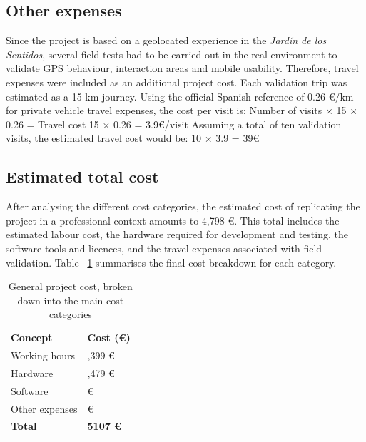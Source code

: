 \subsection{Other expenses}
Since the project is based on a geolocated experience in the \textit{Jardín de los Sentidos}, several field tests had to be carried out in the real environment to validate GPS behaviour, interaction areas and mobile usability. Therefore, travel expenses were included as an additional project cost.
Each validation trip was estimated as a 15 km journey. Using the official Spanish reference of 0.26 €/km for private vehicle travel expenses, the cost per visit is:
Number of visits × 15 × 0.26 = Travel cost      
15 × 0.26 = 3.9€/visit
Assuming a total of  ten validation visits, the estimated travel cost would be:
10 × 3.9 =  39€

\subsection{Estimated total cost}
After analysing the different cost categories, the estimated cost of replicating the project in a professional context amounts to 4,798 €. This total includes the estimated labour cost, the hardware required for development and testing, the software tools and licences, and the travel expenses associated with field validation. Table ~\ref{tab:general_costs} summarises the final cost breakdown for each category.




\vspace{1cm}
\begin{table}[htpb]
\centering
\caption{General project cost, broken down into the main cost categories}
\label{tab:general_costs}
\renewcommand{\arraystretch}{1.5}
\begin{tabular}{>{\raggedright\arraybackslash}p{} >{\raggedleft\arraybackslash}p{}}
\rowcolor[HTML]{B0C9B0} \textbf{Concept} & \textbf{Cost (€)} \\
\rowcolor[HTML]{F0F5F0} Working hours & 3,399 €\\
\rowcolor[HTML]{DFE8DF} Hardware & 1,479 €\\
\rowcolor[HTML]{F0F5F0} Software & 190 €\\
\rowcolor[HTML]{DFE8DF} Other expenses & 39 €\\
\hline
\rowcolor[HTML]{B0C9B0} \textbf{Total} & \textbf{5107 €} \\
\end{tabular}
\end{table}

